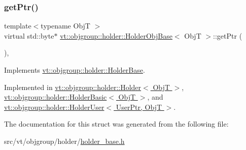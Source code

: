 \mbox{\label{structvt_1_1objgroup_1_1holder_1_1_holder_obj_base_abd46e1aa84c0fea2554bf19029581e01}} 
\subsubsection{\texorpdfstring{get\+Ptr()}{getPtr()}}
{\footnotesize\ttfamily template$<$typename ObjT $>$ \\
virtual std\+::byte$\ast$ \hyperlink{structvt_1_1objgroup_1_1holder_1_1_holder_obj_base}{vt\+::objgroup\+::holder\+::\+Holder\+Obj\+Base}$<$ ObjT $>$\+::get\+Ptr (\begin{DoxyParamCaption}{ }\end{DoxyParamCaption})\hspace{0.3cm}{\ttfamily [override]}, {}}



Implements \hyperlink{structvt_1_1objgroup_1_1holder_1_1_holder_base_a9a15090cce1921fe9116a93b11b47be2}{vt\+::objgroup\+::holder\+::\+Holder\+Base}.



Implemented in \hyperlink{structvt_1_1objgroup_1_1holder_1_1_holder_a421058daef664fb76d90439aef1aaea5}{vt\+::objgroup\+::holder\+::\+Holder$<$ Obj\+T $>$}, \hyperlink{structvt_1_1objgroup_1_1holder_1_1_holder_basic_a857b56b22964a3524169f6fa30307d65}{vt\+::objgroup\+::holder\+::\+Holder\+Basic$<$ Obj\+T $>$}, and \hyperlink{structvt_1_1objgroup_1_1holder_1_1_holder_user_a85c5a7613142e86a830a0b5103f83ce4}{vt\+::objgroup\+::holder\+::\+Holder\+User$<$ User\+Ptr, Obj\+T $>$}.



The documentation for this struct was generated from the following file\+:\begin{DoxyCompactItemize}
\item 
src/vt/objgroup/holder/\hyperlink{holder__base_8h}{holder\+\_\+base.\+h}\end{DoxyCompactItemize}
